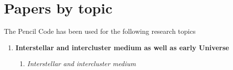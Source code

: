 \documentclass[12pt]{article}
\begin{document}
\section{Papers by topic}

The {\sc Pencil Code} has been used for the following research topics
\begin{enumerate}

\item
{\bf Interstellar and intercluster medium as well as early Universe}

\begin{enumerate}
\item
{\em Interstellar and intercluster medium} \citep{
2023A&A...677A..46E,%
2023MNRAS.523.1056P,%
2023ApJ...943..176G,%
2022MNRAS.513.2136B,%
2021arXiv210801936M,%
2021ApJ...910L..15G,%
2021A&A...648A..52L,%
2021arXiv211201193C,%
2020ApJ...896...86C,%
2020ApJ...903..148L,%
2020MNRAS.496.4749B,%
2020ApJ...896L..14B,%
2020GApFD.114...77G,%
2019arXiv190808781E,%
2019MNRAS.488.5065E,%
2019Galax...7...45S,%
2019MNRAS.487..975R,%
2019MNRAS.487.2673B,%
2018A&A...614A.101V,%
}
\end{enumerate}
\end{enumerate}
\end{document}
